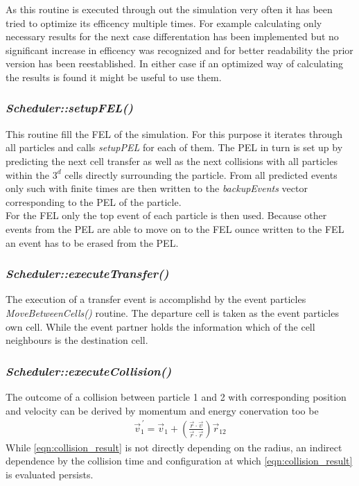 As this routine is executed through out the simulation very often it has been tried to optimize its efficency multiple times. For example calculating only necessary results for the next case differentation has been implemented but no significant increase in efficency was recognized and for better readability the prior version has been reestablished. In either case if an optimized way of calculating the results is found it might be useful to use them.\\    

\subsubsection{\quad \textit{Scheduler::setupFEL()}}
This routine fill the FEL of the simulation. For this purpose it iterates through all particles and calls \textit{setupPEL} for each of them. The PEL in turn is set up by predicting the next cell transfer as well as the next collisions with all particles within the $3^d$ cells directly surrounding the particle. From all predicted events only such with finite times are then written to the \textit{backupEvents} vector corresponding to the PEL of the particle.\\
For the FEL only the top event of each particle is then used. Because other events from the PEL are able to move on to the FEL ounce written to the FEL an event has to be erased from the PEL.\\

\subsubsection{\quad \textit{Scheduler::executeTransfer()}}
The execution of a transfer event is accomplishd by the event particles \textit{MoveBetweenCells()} routine. The departure cell is taken as the event particles own cell. While the event partner holds the information which of the cell neighbours is the destination cell.\\

\subsubsection{\quad \textit{Scheduler::executeCollision()}}
The outcome of a collision between particle 1 and 2 with corresponding position and velocity can be derived by momentum and energy conervation  too be 
\begin{align}
\label{eqn:collision_result}
\vec{v}_1^{\,'} = \vec{v}_1 + \left( \frac{\vec{r} \cdot \vec{v} }{\vec{r} \cdot \vec{r}} \right) \vec{r}_{12}
\end{align}
While \autoref{eqn:collision_result} is not directly depending on the radius, an indirect dependence  by the collision time and configuration at which \autoref{eqn:collision_result} is evaluated persists.
 
